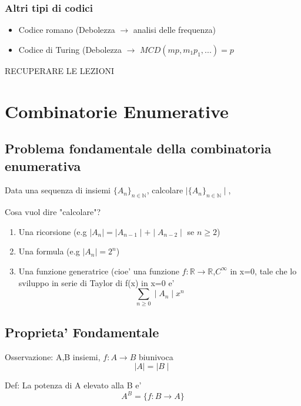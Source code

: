\documentclass{article}
\begin{document}
     \subsubsection{Altri tipi di codici}
     \begin{itemize}
       \item Codice romano (Debolezza $\to$ analisi delle frequenza)
       \item Codice di Turing (Debolezza $\to$ $MCD(mp,m_1p_1,...)=p$
     \end{itemize}
     RECUPERARE LE LEZIONI
     \section{Combinatorie Enumerative}
     \subsection{Problema fondamentale della combinatoria enumerativa}
     \begin{flushleft}
       Data una sequenza di insiemi $\{A_n\}_{n \in \mathbb{N}}$, calcolare $\mid \{A_n\}_{n \in \mathbb{N}}\mid  $,
     \end{flushleft}
      Cosa vuol dire "calcolare"?
     \begin{enumerate}
      \item Una ricorsione (e.g $\mid A_n\mid = \mid A_{n-1} \mid + \mid A_{n-2} \mid$ se $n \geq 2$)
      \item Una formula (e.g $\mid A_n \mid = 2^n$)
      \item Una funzione generatrice (cioe' una funzione $f: \mathbb{R} \to \mathbb{R}$,$C^\infty$ in x=0, tale che lo sviluppo in serie di Taylor di f(x) in x=0 e'
        \begin{equation}
          \sum_{n\geq 0} \mid A_n \mid  x^n
        \end{equation}
      \end{enumerate}
      \subsection{Proprieta' Fondamentale}
      \begin{flushleft}
        Osservazione: A,B insiemi, $f:A\to B$ biunivoca
        \begin{equation}
          \mid A \mid = \mid B \mid 
        \end{equation}
      \end{flushleft}
      \begin{flushleft}
        Def: La potenza di A elevato alla B e'
        \begin{equation}
          A^B=\{f:B\to A\}
        \end{equation}
      \end{flushleft}
\end{document}
